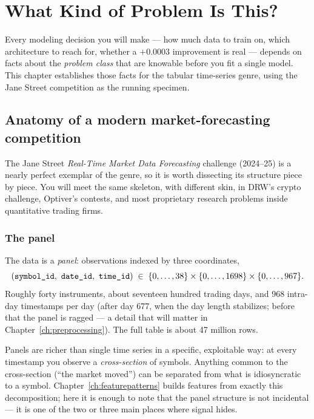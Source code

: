 \chapter{What Kind of Problem Is This?}
\label{ch:problem}

Every modeling decision you will make --- how much data to train on, which
architecture to reach for, whether a $+0.0003$ improvement is real ---
depends on facts about the \emph{problem class} that are knowable before you
fit a single model. This chapter establishes those facts for the tabular
time-series genre, using the Jane Street competition as the running specimen.

\section{Anatomy of a modern market-forecasting competition}

The Jane Street \emph{Real-Time Market Data Forecasting} challenge (2024--25)
is a nearly perfect exemplar of the genre, so it is worth dissecting its
structure piece by piece. You will meet the same skeleton, with different
skin, in DRW's crypto challenge, Optiver's contests, and most proprietary
research problems inside quantitative trading firms.

\subsection{The panel}

The data is a \emph{panel}: observations indexed by three coordinates,
\[
(\text{\code{symbol\_id}},\ \text{\code{date\_id}},\ \text{\code{time\_id}})
\;\in\; \{0,\dots,38\} \times \{0,\dots,1698\} \times \{0,\dots,967\}.
\]
Roughly forty instruments, about seventeen hundred trading days, and 968
intra-day timestamps per day (after day 677, when the day length stabilizes;
before that the panel is ragged --- a detail that will matter in
Chapter~\ref{ch:preprocessing}). The full table is about 47 million rows.

Panels are richer than single time series in a specific, exploitable way:
at every timestamp you observe a \emph{cross-section} of symbols. Anything
common to the cross-section (``the market moved'') can be separated from
what is idiosyncratic to a symbol. Chapter~\ref{ch:featurepatterns} builds
features from exactly this decomposition; here it is enough to note that the
panel structure is not incidental --- it is one of the two or three main
places where signal hides.


